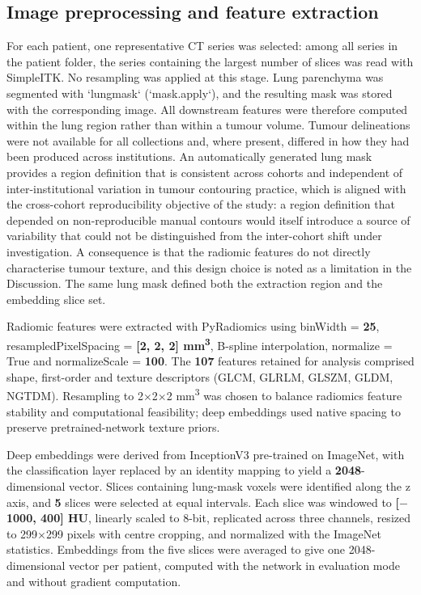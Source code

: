 \documentclass[a4paper,fleqn]{cas-sc}
\begin{document}
\subsection{Image preprocessing and feature extraction}

For each patient, one representative CT series was selected: among all series in the patient folder, the series containing the largest number of slices was read with SimpleITK. No resampling was applied at this stage. Lung parenchyma was segmented with `lungmask` (`mask.apply`), and the resulting mask was stored with the corresponding image. All downstream features were therefore computed within the lung region rather than within a tumour volume. Tumour delineations were not available for all collections and, where present, differed in how they had been produced across institutions. An automatically generated lung mask provides a region definition that is consistent across cohorts and independent of inter-institutional variation in tumour contouring practice, which is aligned with the cross-cohort reproducibility objective of the study: a region definition that depended on non-reproducible manual contours would itself introduce a source of variability that could not be distinguished from the inter-cohort shift under investigation. A consequence is that the radiomic features do not directly characterise tumour texture, and this design choice is noted as a limitation in the Discussion. The same lung mask defined both the extraction region and the embedding slice set.

Radiomic features were extracted with PyRadiomics using binWidth = \textbf{25}, resampledPixelSpacing = \textbf{[2, 2, 2] mm\textsuperscript{3}}, B-spline interpolation, normalize = True and normalizeScale = \textbf{100}. The \textbf{107} features retained for analysis comprised shape, first-order and texture descriptors (GLCM, GLRLM, GLSZM, GLDM, NGTDM). Resampling to 2$\times$2$\times$2 mm\textsuperscript{3} was chosen to balance radiomics feature stability and computational feasibility; deep embeddings used native spacing to preserve pretrained-network texture priors.

Deep embeddings were derived from InceptionV3 pre-trained on ImageNet, with the classification layer replaced by an identity mapping to yield a \textbf{2048}-dimensional vector. Slices containing lung-mask voxels were identified along the z axis, and \textbf{5} slices were selected at equal intervals. Each slice was windowed to \textbf{[$-$1000, 400] HU}, linearly scaled to 8-bit, replicated across three channels, resized to 299$\times$299 pixels with centre cropping, and normalized with the ImageNet statistics. Embeddings from the five slices were averaged to give one 2048-dimensional vector per patient, computed with the network in evaluation mode and without gradient computation.
\end{document}
